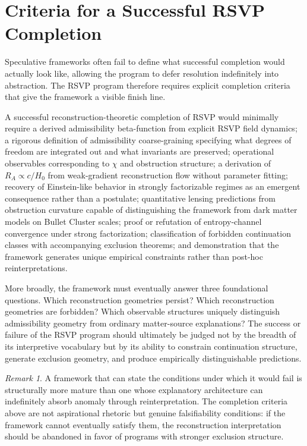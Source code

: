 \documentclass[11pt, a4paper]{article}
\theoremstyle{plain}
\theoremstyle{definition}
\theoremstyle{remark}
\newtheorem{remark}[theorem]{Remark}
\newcommand{\RA}{R_{\!A}}
\begin{document}
\section{Criteria for a Successful RSVP Completion}
\label{sec:completion}

Speculative frameworks often fail to define what successful completion would actually
look like, allowing the program to defer resolution indefinitely into abstraction. The
RSVP program therefore requires explicit completion criteria that give the framework a
visible finish line.

A successful reconstruction-theoretic completion of RSVP would minimally require a
derived admissibility beta-function from explicit RSVP field dynamics; a rigorous
definition of admissibility coarse-graining specifying what degrees of freedom are
integrated out and what invariants are preserved; operational observables
corresponding to $\chi$ and obstruction structure; a derivation of $\RA \propto
c/H_0$ from weak-gradient reconstruction flow without parameter fitting; recovery of
Einstein-like behavior in strongly factorizable regimes as an emergent consequence
rather than a postulate; quantitative lensing predictions from obstruction curvature
capable of distinguishing the framework from dark matter models on Bullet Cluster
scales; proof or refutation of entropy-channel convergence under strong factorization;
classification of forbidden continuation classes with accompanying exclusion theorems;
and demonstration that the framework generates unique empirical constraints rather
than post-hoc reinterpretations.

More broadly, the framework must eventually answer three foundational questions. Which
reconstruction geometries persist? Which reconstruction geometries are forbidden?
Which observable structures uniquely distinguish admissibility geometry from
ordinary matter-source explanations? The success or failure of the RSVP program
should ultimately be judged not by the breadth of its interpretive vocabulary but by
its ability to constrain continuation structure, generate exclusion geometry, and
produce empirically distinguishable predictions.

\begin{remark}
A framework that can state the conditions under which it would fail is structurally
more mature than one whose explanatory architecture can indefinitely absorb anomaly
through reinterpretation. The completion criteria above are not aspirational rhetoric
but genuine falsifiability conditions: if the framework cannot eventually satisfy
them, the reconstruction interpretation should be abandoned in favor of programs with
stronger exclusion structure.
\end{remark}
\end{document}
